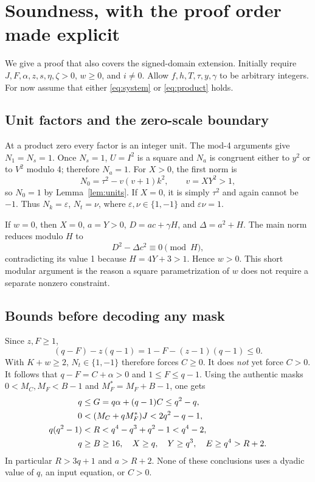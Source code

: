 \documentclass[11pt,a4paper]{article}
\theoremstyle{remark}\newtheorem{remark}[theorem]{Remark}
\begin{document}
\section{Soundness, with the proof order made explicit}\label{sec:soundness}
We give a proof that also covers the signed-domain extension. Initially
require $J,F,\alpha,z,s,\eta,\zeta>0$, $w\ge0$, and $i\ne0$.
Allow $f,h,T,\tau,y,\gamma$ to be arbitrary integers. For now assume
that either \eqref{eq:system} or \eqref{eq:product} holds.

\subsection{Unit factors and the zero-scale boundary}
At a product zero every factor is an integer unit. The mod-4 arguments
give $N_1=N_s=1$. Once $N_s=1$, $U=I^2$ is a square and
$N_a$ is congruent either to $y^2$ or to $V^2$ modulo 4;
therefore $N_a=1$. For $X>0$, the first norm is
\[
 N_0=\tau^2-v(v+1)k^2,\qquad v=XY^2>1,
\]
so $N_0=1$ by Lemma~\ref{lem:units}. If $X=0$, it is simply
$\tau^2$ and again cannot be $-1$.
Thus $N_k=\varepsilon$, $N_t=\nu$, where
$\varepsilon,\nu\in\{1,-1\}$ and $\varepsilon\nu=1$.

If $w=0$, then $X=0$, $a=Y>0$, $D=ac+\gamma H$, and
$\Delta=a^2+H$. The main norm reduces modulo $H$ to
\[
 D^2-\Delta c^2\equiv0\pmod H,
\]
contradicting its value 1 because $H=4Y+3>1$.
Hence $w>0$. This short modular argument is the reason a square
parametrization of $w$ does not require a separate nonzero constraint.

\subsection{Bounds before decoding any mask}
Since $z,F\ge1$,
\[
 (q-F)-z(q-1)=1-F-(z-1)(q-1)\le0.
\]
With $K+w\ge2$, $N_t\in\{1,-1\}$ therefore forces $C\ge0$.
It does \emph{not} yet force $C>0$. It follows that
$q-F=C+\alpha>0$ and $1\le F\le q-1$.
Using the authentic masks $0<M_C,M_F<B-1$ and
$M_F^*=M_F+B-1$, one gets
\begin{align}
 q&\le G=q\alpha+(q-1)C\le q^2-q,\notag\\
 0&<(M_C+qM_F^*)J<2q^2-q-1,\notag\\
 q(q^2-1)&<R<q^4-q^3+q^2-1<q^4-2,\notag\\
 q&\ge B\ge16,\quad X\ge q,\quad Y\ge q^3,
 \quad E\ge q^4>R+2.\label{eq:bounds}
\end{align}
In particular $R>3q+1$ and $a>R+2$. None of these conclusions
uses a dyadic value of $q$, an input equation, or $C>0$.
\end{document}
